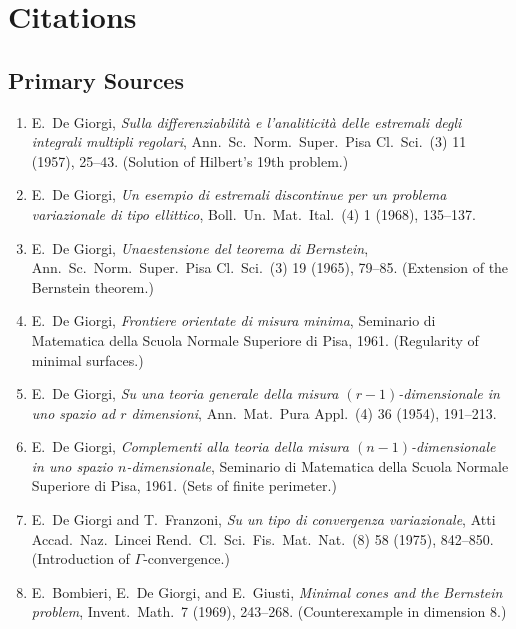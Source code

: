 \section{Citations}\subsection*{Primary Sources}
\begin{enumerate}
    \item E.\ De Giorgi, \textit{Sulla differenziabilit\`a e l'analiticit\`a delle estremali degli integrali multipli regolari}, Ann.\ Sc.\ Norm.\ Super.\ Pisa Cl.\ Sci.\ (3) 11 (1957), 25--43. (Solution of Hilbert's 19th problem.)
    \item E.\ De Giorgi, \textit{Un esempio di estremali discontinue per un problema variazionale di tipo ellittico}, Boll.\ Un.\ Mat.\ Ital.\ (4) 1 (1968), 135--137.
    \item E.\ De Giorgi, \textit{Unaestensione del teorema di Bernstein}, Ann.\ Sc.\ Norm.\ Super.\ Pisa Cl.\ Sci.\ (3) 19 (1965), 79--85. (Extension of the Bernstein theorem.)
    \item E.\ De Giorgi, \textit{Frontiere orientate di misura minima}, Seminario di Matematica della Scuola Normale Superiore di Pisa, 1961. (Regularity of minimal surfaces.)
    \item E.\ De Giorgi, \textit{Su una teoria generale della misura \((r-1)\)-dimensionale in uno spazio ad \(r\) dimensioni}, Ann.\ Mat.\ Pura Appl.\ (4) 36 (1954), 191--213.
    \item E.\ De Giorgi, \textit{Complementi alla teoria della misura \((n-1)\)-dimensionale in uno spazio \(n\)-dimensionale}, Seminario di Matematica della Scuola Normale Superiore di Pisa, 1961. (Sets of finite perimeter.)
    \item E.\ De Giorgi and T.\ Franzoni, \textit{Su un tipo di convergenza variazionale}, Atti Accad.\ Naz.\ Lincei Rend.\ Cl.\ Sci.\ Fis.\ Mat.\ Nat.\ (8) 58 (1975), 842--850. (Introduction of \(\Gamma\)-convergence.)
    \item E.\ Bombieri, E.\ De Giorgi, and E.\ Giusti, \textit{Minimal cones and the Bernstein problem}, Invent.\ Math.\ 7 (1969), 243--268. (Counterexample in dimension 8.)
\end{enumerate}

